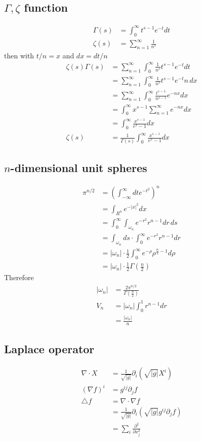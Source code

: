 \documentclass[10pt,a4paper]{book}
\theoremstyle{definition}
\begin{document}
\subsection{\texorpdfstring{$\Gamma,\zeta $}{TEXT} function}
\begin{align}
    \Gamma(s)&=\int_0^\infty t^{s-1}e^{-t} dt\\
    \zeta(s)&=\sum_{n=1}^\infty\frac{1}{n^s}
\end{align}
then with $t/n=x$ and $dx=dt/n$
\begin{align}
	\zeta(s)\Gamma(s)
	&=\sum_{n=1}^\infty\int_0^\infty \frac{1}{n^s}t^{s-1}e^{-t} dt\\
	&=\sum_{n=1}^\infty\int_0^\infty \frac{1}{n^s}t^{s-1}e^{-t} n\,dx\\
	&=\sum_{n=1}^\infty\int_0^\infty \frac{t^{s-1}}{n^{s-1}}e^{-nx} dx\\
	&=\int_0^\infty x^{s-1}\sum_{n=1}^\infty e^{-nx} dx\\
	&=\int_0^\infty \frac{x^{s-1}}{e^{x}-1} dx\\
\zeta(s)&=\frac{1}{\Gamma(s)}\int_0^\infty \frac{x^{s-1}}{e^{x}-1} dx
\end{align}



\subsection{\texorpdfstring{$n$}{TEXT}-dimensional unit spheres}
\begin{align}
    \pi^{n/2}
    &=\left(\int_{-\infty}^\infty dt e^{-t^2}\right)^n\\
    &=\int_{R^n} e^{-|x|^2}dx\\
    &=\int_0^\infty\int_{\omega_n}e^{-r^2}r^{n-1}dr\,ds\\
    &=\int_{\omega_n}ds\cdot\int_0^\infty e^{-r^2}r^{n-1}dr\\
    &=|\omega_n|\cdot\frac{1}{2}\int_0^\infty e^{-\rho}\rho^{\frac{n}{2}-1}d\rho\\
    &=|\omega_n|\cdot\frac{1}{2}\Gamma\left(\frac{n}{2}\right)
\end{align}
Therefore
\begin{align}
|\omega_n| &= \frac{2\pi^{n/2}}{\Gamma\left(\frac{n}{2}\right)}\\
V_n 
&=|\omega_n|\int_0^1r^{n-1}dr\\
&=\frac{|\omega_n|}{n}
\end{align}

\subsection{Laplace operator}
\begin{align}
    \nabla\cdot X&=\frac{1}{\sqrt{|g|}}\partial_i\left(\sqrt{|g|}X^i\right)\\
    (\nabla f)^i&=g^{ij}\partial_jf\\
    \triangle f &= \nabla\cdot\nabla f\\
    &=\frac{1}{\sqrt{|g|}}\partial_i\left(\sqrt{|g|} g^{ij}\partial_jf \right)\\
    &= \sum_i \frac{\partial^2}{\partial x_j^2}
\end{align}
\end{document}
